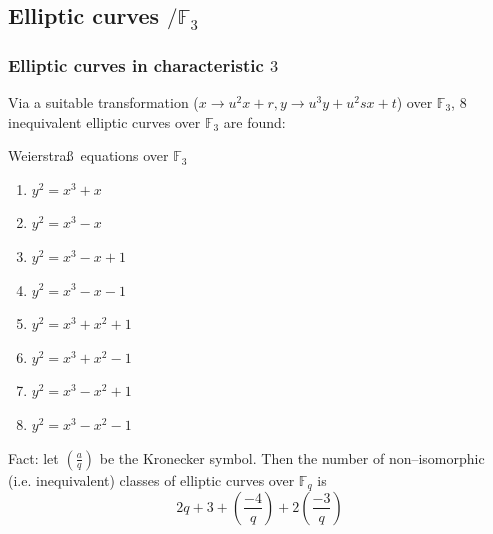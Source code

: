 \documentclass[10pt,handout]{beamer} %
\newcommand{\F}{\mathbb F}
\theoremstyle{definition}
\begin{document}
\subsection{Elliptic curves \texorpdfstring{$/\F_3$}{F3}}
\begin{frame}
\frametitle{Elliptic curves in characteristic $3$}

Via a suitable transformation ($x\rightarrow u^2x+r, y\rightarrow u^3y+u^2sx+t$) over $\F_3$,  $8$ inequivalent
elliptic curves over $\F_3$ are found:\pause

\begin{beamerboxesrounded}[upper=block title example,lower=block body alerted,shadow=true]{Weierstra\ss\ equations over $\F_3$}
\begin{enumerate}
 \item $y^2=x^3+x$
 \item$y^2=x^3 - x$
 \item$y^2=x^3 - x +1$
 \item$y^2=x^3 - x -1$
 \item$y^2=x^3 + x^2 + 1$
 \item$y^2=x^3 + x^2 - 1$
 \item$y^2=x^3 - x^2 + 1$
 \item$y^2=x^3 - x^2 - 1$
 \end{enumerate}
\end{beamerboxesrounded}\pause

\begin{beamerboxesrounded}[upper=postit,lower=block body,shadow=true]{Fact:}
             let $\left(\frac{a}{q}\right)$ be the Kronecker symbol. 
            Then the number of non--isomorphic (i.e. inequivalent) classes of elliptic curves over $\F_q$ is 
$$2q+3+\left(\frac{-4}{q}\right)+2\left(\frac{-3}{q}\right)$$
\end{beamerboxesrounded}




\end{frame}
\end{document}
